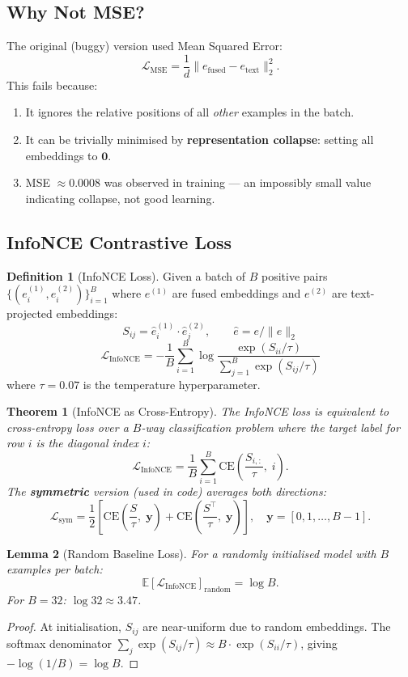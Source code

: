 \documentclass[12pt,a4paper]{article}
\theoremstyle{definition}
\newtheorem{definition}{Definition}[section]
\theoremstyle{plain}
\newtheorem{theorem}{Theorem}[section]
\newtheorem{lemma}[theorem]{Lemma}
\theoremstyle{remark}
\newcommand{\Loss}{\mathcal{L}}
\begin{document}
\subsection{Why Not MSE?}

The original (buggy) version used Mean Squared Error:
\[
  \Loss_{\text{MSE}} = \frac{1}{d}\|e_{\text{fused}} - e_{\text{text}}\|_2^2.
\]
This fails because:
\begin{enumerate}
  \item It ignores the relative positions of all \emph{other} examples in the batch.
  \item It can be trivially minimised by \textbf{representation collapse}: setting all embeddings to $\bm{0}$.
  \item MSE $\approx 0.0008$ was observed in training — an impossibly small value indicating collapse, not good learning.
\end{enumerate}

\subsection{InfoNCE Contrastive Loss}

\begin{definition}[InfoNCE Loss]
Given a batch of $B$ positive pairs $\{(e_i^{(1)}, e_i^{(2)})\}_{i=1}^B$ where
$e^{(1)}$ are fused embeddings and $e^{(2)}$ are text-projected embeddings:
\[
  S_{ij} = \hat{e}_i^{(1)} \cdot \hat{e}_j^{(2)}, \qquad
  \hat{e} = e/\|e\|_2
\]
\[
  \boxed{\Loss_{\text{InfoNCE}} = -\frac{1}{B}\sum_{i=1}^B
    \log\frac{\exp(S_{ii}/\tau)}{\sum_{j=1}^B \exp(S_{ij}/\tau)}}
\]
where $\tau = 0.07$ is the temperature hyperparameter.
\end{definition}

\begin{theorem}[InfoNCE as Cross-Entropy]
The InfoNCE loss is equivalent to cross-entropy loss over a $B$-way classification
problem where the target label for row $i$ is the diagonal index $i$:
\[
  \Loss_{\text{InfoNCE}} = \frac{1}{B}\sum_{i=1}^B
    \mathrm{CE}\!\left(\frac{S_{i,:}}{\tau},\; i\right).
\]
The \textbf{symmetric} version (used in code) averages both directions:
\[
  \Loss_{\text{sym}} = \frac{1}{2}\left[
    \mathrm{CE}\!\left(\frac{S}{\tau},\; \bm{y}\right) +
    \mathrm{CE}\!\left(\frac{S^\top}{\tau},\; \bm{y}\right)
  \right], \quad \bm{y} = [0, 1, \ldots, B{-}1].
\]
\end{theorem}

\begin{lemma}[Random Baseline Loss]
For a randomly initialised model with $B$ examples per batch:
\[
  \mathbb{E}[\Loss_{\text{InfoNCE}}]_{\text{random}} = \log B.
\]
For $B = 32$: $\log 32 \approx 3.47$.
\end{lemma}
\begin{proof}
At initialisation, $S_{ij}$ are near-uniform due to random embeddings.
The softmax denominator $\sum_j \exp(S_{ij}/\tau) \approx B \cdot \exp(S_{ii}/\tau)$,
giving $-\log(1/B) = \log B$.
\end{proof}
\end{document}
